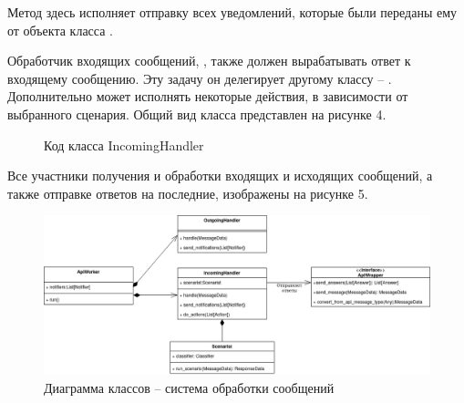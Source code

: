     Метод  здесь исполняет отправку всех уведомлений,
    которые были переданы ему от объекта класса .

    Обработчик входящих сообщений, ,
    также должен вырабатывать ответ к входящему сообщению. 
    Эту задачу он делегирует другому классу -- . 
    Дополнительно  может исполнять некоторые
    действия, в зависимости от выбранного сценария.
    Общий вид класса представлен на рисунке 4.
    \begin{figure}[H]
        \centering
        
        \caption{Код класса IncomingHandler}
        \label{fig:incoming_handler}
    \end{figure}

    Все участники получения и обработки входящих и исходящих сообщений, а также
    отправке ответов на последние, изображены на рисунке 5.
    \begin{figure}[H]
        \centering
        \includegraphics[width=\linewidth]{static/ClassDiagram_ioprocess.png}
        \caption{Диаграмма классов -- система обработки сообщений}
        \label{fig:class-diagram-ioprocess}
    \end{figure}


